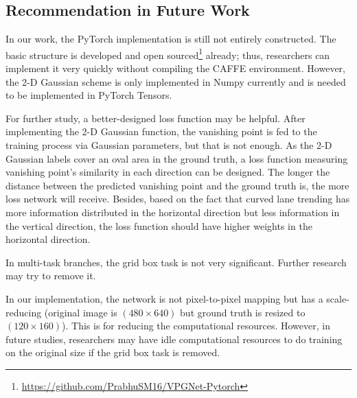 \begin{spacing}{1.5}
\section{Recommendation in Future Work}


In our work, the PyTorch implementation is still not entirely constructed. The basic structure is developed and open sourced\footnote{\url{https://github.com/PrabhuSM16/VPGNet-Pytorch}} already; thus, researchers can implement it very quickly without compiling the CAFFE environment. However, the 2-D Gaussian scheme is only implemented in Numpy currently and is needed to be implemented in PyTorch Tensors. 

For further study, a better-designed loss function may be helpful. After implementing the 2-D Gaussian function, the vanishing point is fed to the training process via Gaussian parameters, but that is not enough. As the 2-D Gaussian labels cover an oval area in the ground truth, a loss function measuring vanishing point's similarity in each direction can be designed. The longer the distance between the predicted vanishing point and the ground truth is, the more loss network will receive. Besides, based on the fact that curved lane trending has more information distributed in the horizontal direction but less information in the vertical direction, the loss function should have higher weights in the horizontal direction.

In multi-task branches, the grid box task is not very significant. Further research may try to remove it.

In our implementation, the network is not pixel-to-pixel mapping but has a scale-reducing (original image is $(480 \times 640)$ but ground truth is resized to $(120 \times 160)$). This is for reducing the computational resources. However, in future studies, researchers may have idle computational resources to do training on the original size if the grid box task is removed. 




\end{spacing}
\newpage
